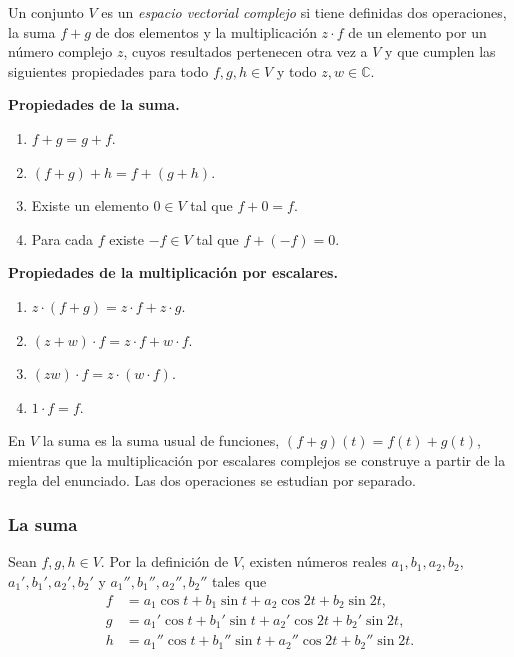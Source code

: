 \begin{definicionT}
Un conjunto $V$ es un \emph{espacio vectorial complejo} si tiene definidas dos operaciones, la
suma $f+g$ de dos elementos y la multiplicación $z\cdot f$ de un elemento por un número
complejo $z$, cuyos resultados pertenecen otra vez a $V$ y que cumplen las
siguientes propiedades para todo $f, g, h\in V$ y todo $z, w\in\mathbb{C}$.

\smallskip
\noindent\textbf{Propiedades de la suma.}
\begin{enumerate}
  \item[(S1)] $f+g = g+f$.
  \item[(S2)] $(f+g)+h = f+(g+h)$.
  \item[(S3)] Existe un elemento $0\in V$ tal que $f+0 = f$.
  \item[(S4)] Para cada $f$ existe $-f\in V$ tal que $f+(-f) = 0$.
\end{enumerate}
\noindent\textbf{Propiedades de la multiplicación por escalares.}
\begin{enumerate}
  \item[(M1)] $z\cdot(f+g) = z\cdot f + z\cdot g$.
  \item[(M2)] $(z+w)\cdot f = z\cdot f + w\cdot f$.
  \item[(M3)] $(zw)\cdot f = z\cdot(w\cdot f)$.
  \item[(M4)] $1\cdot f = f$.
\end{enumerate}
\end{definicionT}

En $V$ la suma es la suma usual de funciones, $(f+g)(t)=f(t)+g(t)$, mientras que la
multiplicación por escalares complejos se construye a partir de la regla del enunciado. Las dos
operaciones se estudian por separado.

\subsubsection*{La suma}

Sean $f, g, h\in V$. Por la definición de $V$, existen números reales
$a_1, b_1, a_2, b_2$, $a_1', b_1', a_2', b_2'$ y $a_1'', b_1'', a_2'', b_2''$ tales que
\begin{align*}
  f &= a_1\cos t + b_1\sin t + a_2\cos 2t + b_2\sin 2t,\\
  g &= a_1'\cos t + b_1'\sin t + a_2'\cos 2t + b_2'\sin 2t,\\
  h &= a_1''\cos t + b_1''\sin t + a_2''\cos 2t + b_2''\sin 2t.
\end{align*}

